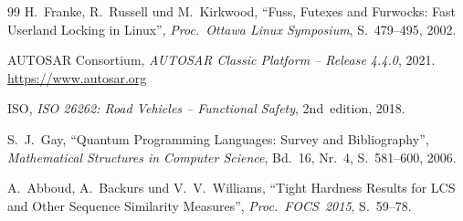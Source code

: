 ﻿\documentclass[a4paper,12pt]{article}
\theoremstyle{definition}
\begin{document}
\begin{thebibliography}{99}
  H.~Franke, R.~Russell und M.~Kirkwood,
  ``Fuss, Futexes and Furwocks: Fast Userland Locking in Linux'',
  \textit{Proc.\ Ottawa Linux Symposium}, S.~479--495, 2002.

  AUTOSAR Consortium,
  \textit{AUTOSAR Classic Platform -- Release 4.4.0},
  2021.
  \url{https://www.autosar.org}

  ISO,
  \textit{ISO 26262: Road Vehicles -- Functional Safety},
  2nd~edition, 2018.

  S.~J.~Gay,
  ``Quantum Programming Languages: Survey and Bibliography'',
  \textit{Mathematical Structures in Computer Science},
  Bd.~16, Nr.~4, S.~581--600, 2006.

  A.~Abboud, A.~Backurs und V.~V.~Williams,
  \enquote{Tight Hardness Results for LCS and Other Sequence Similarity
  Measures},
  \textit{Proc.\ FOCS~2015}, S.~59--78.

\end{thebibliography}
\end{document}
